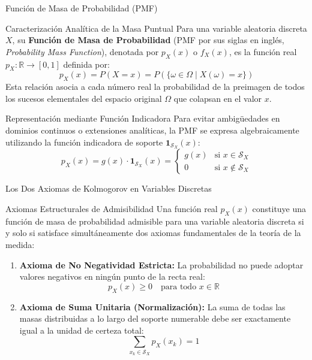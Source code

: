 \documentclass[10pt, aspectratio=169]{beamer}
\begin{document}
\begin{frame}{Función de Masa de Probabilidad (PMF)}
  \fontsize{7.5pt}{9pt}\selectfont
  \begin{block}{Caracterización Analítica de la Masa Puntual}
    \fontsize{7.5pt}{9pt}\selectfont
    Para una variable aleatoria discreta $X$, su \textbf{Función de Masa de Probabilidad} (PMF por sus siglas en inglés, \emph{Probability Mass Function}), denotada por $p_X(x)$ o $f_X(x)$, es la función real $p_X: \mathbb{R} \to [0, 1]$ definida por:
    $$p_X(x) = P(X = x) = P(\{\omega \in \Omega \mid X(\omega) = x\})$$
    Esta relación asocia a cada número real la probabilidad de la preimagen de todos los sucesos elementales del espacio original $\Omega$ que colapsan en el valor $x$.
  \end{block}
  \vspace{-0.15cm}
  \pause
  \begin{alertblock}{Representación mediante Función Indicadora}
    \fontsize{7.5pt}{9pt}\selectfont
    Para evitar ambigüedades en dominios continuos o extensiones analíticas, la PMF se expresa algebraicamente utilizando la función indicadora de soporte $\mathbf{1}_{\mathcal{S}_X}(x)$:
    $$p_X(x) = g(x) \cdot \mathbf{1}_{\mathcal{S}_X}(x) = \begin{cases}
      g(x) & \text{si } x \in \mathcal{S}_X \\
      0 & \text{si } x \notin \mathcal{S}_X
    \end{cases}$$
  \end{alertblock}
\end{frame}

\begin{frame}{Los Dos Axiomas de Kolmogorov en Variables Discretas}
  \begin{block}{Axiomas Estructurales de Admisibilidad}
    Una función real $p_X(x)$ constituye una función de masa de probabilidad admisible para una variable aleatoria discreta si y solo si satisface simultáneamente dos axiomas fundamentales de la teoría de la medida:
    \begin{enumerate}\itemsep=0.2cm
      \item \textbf{Axioma de No Negatividad Estricta:} La probabilidad no puede adoptar valores negativos en ningún punto de la recta real:
      $$p_X(x) \ge 0 \quad \text{para todo } x \in \mathbb{R}$$
      \item \textbf{Axioma de Suma Unitaria (Normalización):} La suma de todas las masas distribuidas a lo largo del soporte numerable debe ser exactamente igual a la unidad de certeza total:
      $$\sum_{x_k \in \mathcal{S}_X} p_X(x_k) = 1$$
    \end{enumerate}
  \end{block}
\end{frame}
\end{document}
